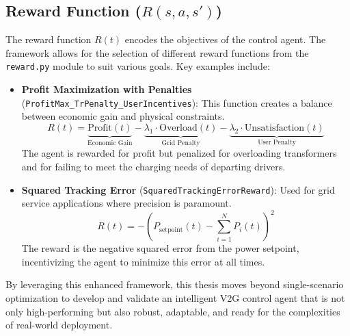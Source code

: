 \subsection{Reward Function ($R(s, a, s')$)}
The reward function $R(t)$ encodes the objectives of the control agent. The framework allows for the selection of different reward functions from the \texttt{reward.py} module to suit various goals. Key examples include:
\begin{itemize}
    \item \textbf{Profit Maximization with Penalties} (\texttt{ProfitMax\_TrPenalty\_UserIncentives}): This function creates a balance between economic gain and physical constraints.
    \[
    R(t) = \underbrace{\text{Profit}(t)}_{\text{Economic Gain}} - \underbrace{\lambda_1 \cdot \text{Overload}(t)}_{\text{Grid Penalty}} - \underbrace{\lambda_2 \cdot \text{Unsatisfaction}(t)}_{\text{User Penalty}}
    \]
    The agent is rewarded for profit but penalized for overloading transformers and for failing to meet the charging needs of departing drivers.
    
    \item \textbf{Squared Tracking Error} (\texttt{SquaredTrackingErrorReward}): Used for grid service applications where precision is paramount.
    \[
    R(t) = - \left( P_{\text{setpoint}}(t) - \sum_{i=1}^N P_i(t) \right)^2
    \]
    The reward is the negative squared error from the power setpoint, incentivizing the agent to minimize this error at all times.
\end{itemize}

By leveraging this enhanced framework, this thesis moves beyond single-scenario optimization to develop and validate an intelligent V2G control agent that is not only high-performing but also robust, adaptable, and ready for the complexities of real-world deployment.




